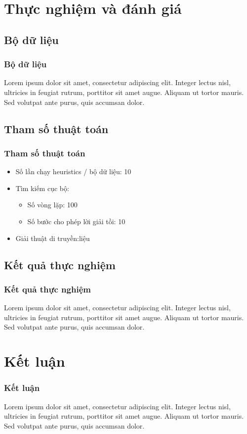 \documentclass{beamer}
\begin{document}
	\section{Thực nghiệm và đánh giá}
	
	
	\subsection{Bộ dữ liệu}
	\begin{frame}
		\frametitle{Bộ dữ liệu}
		Lorem ipsum dolor sit amet, consectetur adipiscing elit. Integer lectus nisl, ultricies in feugiat rutrum, porttitor sit amet augue. Aliquam ut tortor mauris. Sed volutpat ante purus, quis accumsan dolor.
	\end{frame}


	
	\subsection{Tham số thuật toán}
	\begin{frame}
	\frametitle{Tham số thuật toán}
		\begin{itemize}
			\item Số lần chạy heuristics / bộ dữ liệu: 10
			\item {
				Tìm kiếm cục bộ:
				\begin{itemize}
					\item Số vòng lặp: 100
					\item Số bước cho phép lời giải tồi: 10
				\end{itemize}
			}
			\item {
				Giải thuật di truyền:liệu
			}
		\end{itemize}
	\end{frame}

	\subsection{Kết quả thực nghiệm}
	\begin{frame}
	\frametitle{Kết quả thực nghiệm}
	Lorem ipsum dolor sit amet, consectetur adipiscing elit. Integer lectus nisl, ultricies in feugiat rutrum, porttitor sit amet augue. Aliquam ut tortor mauris. Sed volutpat ante purus, quis accumsan dolor.
\end{frame}

	
	\section{Kết luận}
	
	
	\begin{frame}
		\frametitle{Kết luận}
		Lorem ipsum dolor sit amet, consectetur adipiscing elit. Integer lectus nisl, ultricies in feugiat rutrum, porttitor sit amet augue. Aliquam ut tortor mauris. Sed volutpat ante purus, quis accumsan dolor.
	\end{frame}
	
\end{document}
